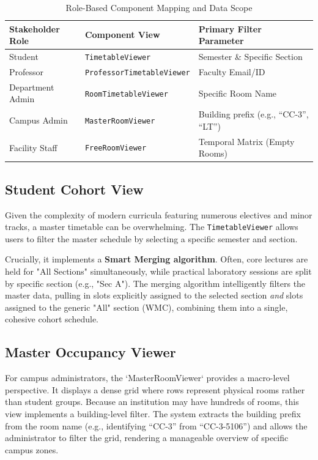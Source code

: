 \begin{table}[htbp]
\centering
\caption{Role-Based Component Mapping and Data Scope}
\label{tab:view_mapping}
\renewcommand{\arraystretch}{1.4}
\begin{tabularx}{\textwidth}{@{} l X l @{}}
\toprule
\textbf{Stakeholder Role} & \textbf{Component View} & \textbf{Primary Filter Parameter} \\
\midrule
Student & \texttt{TimetableViewer} & Semester \& Specific Section \\
Professor & \texttt{ProfessorTimetableViewer} & Faculty Email/ID \\
Department Admin & \texttt{RoomTimetableViewer} & Specific Room Name \\
Campus Admin & \texttt{MasterRoomViewer} & Building prefix (e.g., ``CC-3'', ``LT'') \\
Facility Staff & \texttt{FreeRoomViewer} & Temporal Matrix (Empty Rooms) \\
\bottomrule
\end{tabularx}
\end{table}

\subsection{Student Cohort View}
Given the complexity of modern curricula featuring numerous electives and minor tracks, a master timetable can be overwhelming. The \texttt{TimetableViewer} allows users to filter the master schedule by selecting a specific semester and section.

Crucially, it implements a \textbf{Smart Merging algorithm}. Often, core lectures are held for "All Sections" simultaneously, while practical laboratory sessions are split by specific section (e.g., "Sec A"). The merging algorithm intelligently filters the master data, pulling in slots explicitly assigned to the selected section \textit{and} slots assigned to the generic "All" section (WMC), combining them into a single, cohesive cohort schedule.

\subsection{Master Occupancy Viewer}
For campus administrators, the `MasterRoomViewer` provides a macro-level perspective. It displays a dense grid where rows represent physical rooms rather than student groups. Because an institution may have hundreds of rooms, this view implements a building-level filter. The system extracts the building prefix from the room name (e.g., identifying ``CC-3'' from ``CC-3-5106'') and allows the administrator to filter the grid, rendering a manageable overview of specific campus zones.

